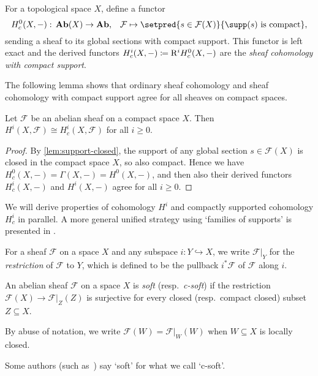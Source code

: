 \begin{defn}
For a topological space \(X\), define a functor
\[ H^0_c(X,-)\colon\catAbelianSheaf(X)\to\catAbelianGroup\text{,}\quad\mathcal F\mapsto\setpred{s\in\mathcal F(X)}{\supp(s)\text{ is compact}}\text{,} \]
sending a sheaf to its global sections with compact support.
This functor is left exact and the derived functors \(H^i_c(X,-)\coloneq\mathrm{R}^iH^0_c(X,-)\) are the \emph{sheaf cohomology with compact support}.
\end{defn}

The following lemma shows that ordinary sheaf cohomology and sheaf cohomology with compact support agree for all sheaves on compact spaces.

\begin{lem}\label{lem:compactly-supported-cohomology-is-ordinary-cohomology-on-compact-space}
Let \(\mathcal F\) be an abelian sheaf on a compact space \(X\).
Then \(H^i(X,\mathcal F)\cong H^i_c(X,\mathcal F)\) for all \(i\geq 0\).
\end{lem}
\begin{proof}
By \cref{lem:support-closed}, the support of any global section \(s\in\mathcal F(X)\) is closed in the compact space \(X\), so also compact.
Hence we have \(H^0_c(X,-) = \Gamma(X,-) = H^0(X,-)\), and then also their derived functors \(H^i_c(X,-)\) and \(H^i(X,-)\) agree for all \(i\geq 0\).
\end{proof}

We will derive properties of cohomology \(H^i\) and compactly supported cohomology \(H^i_c\) in parallel.
A more general unified strategy using `families of supports' is presented in \cite[\S~\RN{2}.9]{BredonSheafTheory}.

For a sheaf \(\mathcal F\) on a space \(X\) and any subspace \(i\colon Y\hookrightarrow X\), we write \(\mathcal F|_Y\) for the \emph{restriction} of \(\mathcal F\) to \(Y\), which is defined to be the pullback \(i^*\mathcal F\) of \(\mathcal F\) along \(i\).

\begin{defn}
An abelian sheaf \(\mathcal F\) on a space \(X\) is \emph{soft} (resp.~\emph{c-soft}) if the restriction \(\mathcal F(X)\to\mathcal F|_Z(Z)\) is surjective for every closed (resp.~compact closed) subset \(Z\subseteq X\).
\end{defn}

By abuse of notation, we write \(\mathcal F(W)=\mathcal F|_W(W)\) when \(W\subseteq X\) is locally closed.

\begin{rmk}
Some authors (such as~\cite{IversenCohomologyOfSheaves}) say `soft' for what we call `c-soft'.
\end{rmk}

